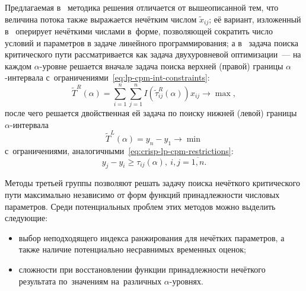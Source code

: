 Предлагаемая в~\cite{Indians_FCPM} методика решения отличается от вышеописанной тем, что величина потока также выражается нечётким числом $\tilde x_{ij}$; её вариант, изложенный в~\cite{Kumar_FCPM_Triangular} оперирует нечёткими числами в~форме, позволяющей сократить число условий и параметров в задаче линейного программирования; а в~\cite{Egyptians, Chen} задача поиска критического пути рассматривается как задача двухуровневой оптимизации~--- на каждом $\alpha$-уровне решается вначале задача поиска верхней (правой) границы $\alpha$-интервала с~ограничениями~\eqref{eq:lp-cpm-int-constraints}:
\begin{equation*}
  \tilde T^R \left( \alpha \right) = \sum \limits_{i=1}^{n} \sum \limits_{j=1}^{n} I\left(\tilde \tau_{ij}^R \left(\alpha \right) \right)x_{ij} \to \max,
\end{equation*}
после чего решается двойственная ей задача по поиску нижней (левой) границы $\alpha$-интервала
\begin{equation*}
  \tilde T^L \left( \alpha \right) = y_n-y_1 \to \min
\end{equation*}
с~ограничениями, аналогичными~\eqref{eq:crisp-lp-cpm-restrictions}:
\begin{equation*}
  y_j-y_i \geqslant \tau_{ij}\left( \alpha \right),\ i,j=\overline{1, n}.
\end{equation*}

Методы третьей группы позволяют решать задачу поиска нечёткого критического пути максимально независимо от форм функций принадлежности числовых параметров. Среди потенциальных проблем этих методов можно выделить следующие:
\begin{itemize}
  \item выбор неподходящего индекса ранжирования для нечётких параметров, а также наличие потенциально несравнимых временных оценок;
  \item сложности при восстановлении функции принадлежности нечёткого результата по~значениям на~различных $\alpha$-уровнях.
\end{itemize}